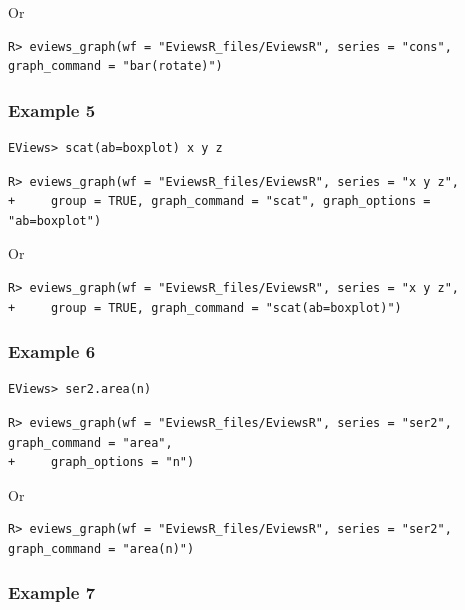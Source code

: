 Or

\begin{verbatim}
R> eviews_graph(wf = "EviewsR_files/EviewsR", series = "cons", graph_command = "bar(rotate)")
\end{verbatim}

\hypertarget{example-5}{%
\subsubsection{Example 5}\label{example-5}}

\begin{verbatim}
EViews> scat(ab=boxplot) x y z
\end{verbatim}

\begin{verbatim}
R> eviews_graph(wf = "EviewsR_files/EviewsR", series = "x y z",
+     group = TRUE, graph_command = "scat", graph_options = "ab=boxplot")
\end{verbatim}

Or

\begin{verbatim}
R> eviews_graph(wf = "EviewsR_files/EviewsR", series = "x y z",
+     group = TRUE, graph_command = "scat(ab=boxplot)")
\end{verbatim}

\hypertarget{example-6}{%
\subsubsection{Example 6}\label{example-6}}

\begin{verbatim}
EViews> ser2.area(n)
\end{verbatim}

\begin{verbatim}
R> eviews_graph(wf = "EviewsR_files/EviewsR", series = "ser2", graph_command = "area",
+     graph_options = "n")
\end{verbatim}

Or

\begin{verbatim}
R> eviews_graph(wf = "EviewsR_files/EviewsR", series = "ser2", graph_command = "area(n)")
\end{verbatim}

\hypertarget{example-7}{%
\subsubsection{Example 7}\label{example-7}}

